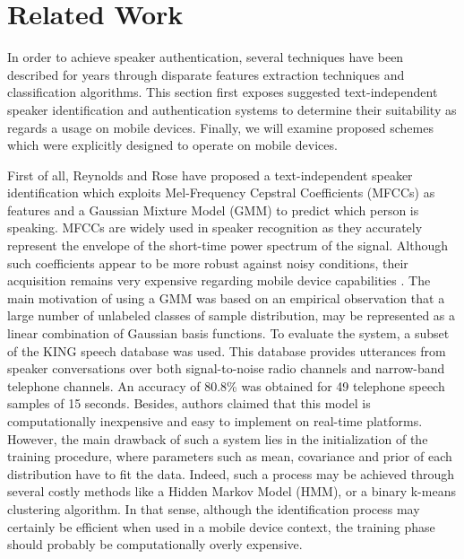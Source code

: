 \documentclass[cryptography,article,submit,moreauthors,pdftex,10pt,a4paper]{mdpi}
\begin{document}
\section{Related Work}

In order to achieve speaker authentication, several techniques have been described for years through disparate features extraction techniques and classification algorithms. This section first exposes suggested text-independent speaker identification and authentication systems to determine their suitability as regards a usage on mobile devices. Finally, we will examine proposed schemes which were explicitly designed to operate on mobile devices.

First of all, Reynolds and Rose \cite{20} have proposed a text\hyp{}independent speaker identification which exploits Mel-Frequency Cepstral Coefficients (MFCCs) as features and a Gaussian Mixture Model (GMM) to predict which person is speaking. MFCCs are widely used in speaker recognition as they accurately represent the envelope of the short-time power spectrum of the signal. Although such coefficients appear to be more robust against noisy conditions, their acquisition remains very expensive regarding mobile device capabilities \cite{22}. The main motivation of using a GMM was based on an empirical observation that a large number of unlabeled classes of sample distribution, may be represented as a linear combination of Gaussian basis functions. To evaluate the system, a subset of the KING speech database was used. This database provides utterances from speaker conversations over both signal-to-noise radio channels and narrow-band telephone channels. An accuracy of 80.8\% was obtained for 49 telephone speech samples of 15 seconds. Besides, authors claimed that this model is computationally inexpensive and easy to implement on real-time platforms. However, the main drawback of such a system lies in the initialization of the training procedure, where parameters such as mean, covariance and prior of each distribution have to fit the data. Indeed, such a process may be achieved through several costly methods like a Hidden Markov Model (HMM), or a binary k-means clustering algorithm. In that sense, although the identification process may certainly be efficient when used in a mobile device context, the training phase should probably be computationally overly expensive.
\end{document}

